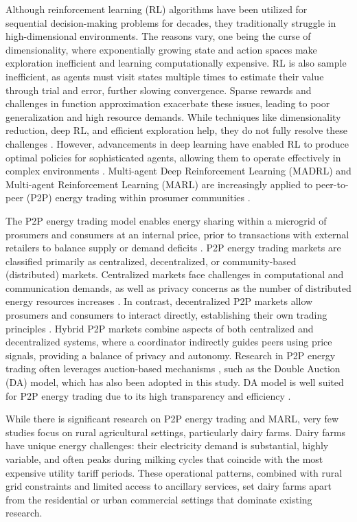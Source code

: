\documentclass[preprint,12pt]{elsarticle}
\begin{document}
Although reinforcement learning (RL) algorithms have been utilized for sequential decision-making problems for decades, they traditionally struggle in high-dimensional environments. The reasons vary, one being the curse of dimensionality, where exponentially growing state and action spaces make exploration inefficient and learning computationally expensive. RL is also sample inefficient, as agents must visit states multiple times to estimate their value through trial and error, further slowing convergence. Sparse rewards and challenges in function approximation exacerbate these issues, leading to poor generalization and high resource demands. While techniques like dimensionality reduction, deep RL, and efficient exploration help, they do not fully resolve these challenges \cite{dulac2021challenges}. However, advancements in deep learning have enabled RL to produce optimal policies for sophisticated agents, allowing them to operate effectively in complex environments \cite{nguyen2020deep}. Multi-agent Deep Reinforcement Learning (MADRL) and Multi-agent Reinforcement Learning (MARL) are increasingly applied to peer-to-peer (P2P) energy trading within prosumer communities \cite{shah2024multi}.

The P2P energy trading model enables energy sharing within a microgrid of prosumers and consumers at an internal price, prior to transactions with external retailers to balance supply or demand deficits \cite{zhou2018evaluation}. P2P energy trading markets are classified primarily as centralized, decentralized, or community-based (distributed) markets. Centralized markets face challenges in computational and communication demands, as well as privacy concerns as the number of distributed energy resources increases \cite{umer2021novel}. In contrast, decentralized P2P markets allow prosumers and consumers to interact directly, establishing their own trading principles \cite{zhou2020state, guerrero2017study}. Hybrid P2P markets combine aspects of both centralized and decentralized systems, where a coordinator indirectly guides peers using price signals, providing a balance of privacy and autonomy. Research in P2P energy trading often leverages auction-based mechanisms \cite{zhou2020state, qiu2022mean}, such as the Double Auction (DA) model, which has also been adopted in this study. DA model is well suited for P2P energy trading due to its high transparency and efficiency \cite{qiu2022mean}\cite{malik2023comparative}.


While there is significant research on P2P energy trading and MARL, very few studies focus on rural agricultural settings, particularly dairy farms. Dairy farms have unique energy challenges: their electricity demand is substantial, highly variable, and often peaks during milking cycles that coincide with the most expensive utility tariff periods. These operational patterns, combined with rural grid constraints and limited access to ancillary services, set dairy farms apart from the residential or urban commercial settings that dominate existing research.
\end{document}
